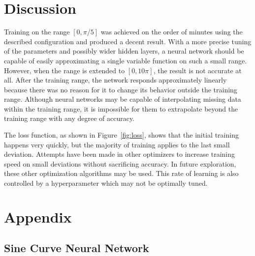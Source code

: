 \documentclass{article}
\begin{document}
    \section{Discussion}
        Training on the range $[0,\pi/5]$ was achieved on the order of minutes using the described configuration and produced a decent result. With a more precise tuning of the parameters and possibly wider hidden layers, a neural network should be capable of easily approximating a single variable function on such a small range. However, when the range is extended to $[0,10\pi]$, the result is not accurate at all. After the training range, the network responds approximately linearly because there was no reason for it to change its behavior outside the training range. Although neural networks may be capable of interpolating missing data within the training range, it is impossible for them to extrapolate beyond the training range with any degree of accuracy.

        The loss function, as shown in Figure~\ref{fig:loss}, shows that the initial training happens very quickly, but the majority of training applies to the last small deviation. Attempts have been made in other optimizers to increase training speed on small deviations without sacrificing accuracy. In future exploration, these other optimization algorithms may be used. This rate of learning is also controlled by a hyperparameter which may not be optimally tuned.
    \printbibliography{}

    \appendix
    \section{Appendix}
    \setcounter{secnumdepth}{2}
    \renewcommand{\thesubsection}{\Alph{subsection}}
    \subsection{Sine Curve Neural Network} \label{apx:code1}
    
\end{document}
